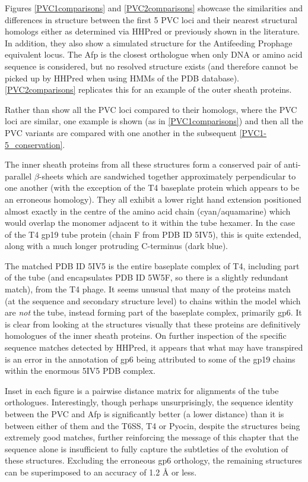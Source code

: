 Figures \vref{PVC1comparisons} and \vref{PVC2comparisons} showcase the similarities and differences in structure between the first 5 PVC loci and their nearest structural homologs either as determined via HHPred or previously shown in the literature. In addition, they also show a simulated structure for the Antifeeding Prophage equivalent locus. The Afp is the closest orthologue when only DNA or amino acid sequence is considered, but no resolved structure exists (and therefore cannot be picked up by HHPred when using HMMs of the PDB database). \vref{PVC2comparisons} replicates this for an example of the outer sheath proteins.

Rather than show all the PVC loci compared to their homologs, where the PVC loci are similar, one example is shown (as in \vref{PVC1comparisons}) and then all the PVC variants are compared with one another in the subsequent \vref{PVC1-5_conservation}.

The inner sheath proteins from all these structures form a conserved pair of anti-parallel $\beta$-sheets which are sandwiched together approximately perpendicular to one another (with the exception of the T4 baseplate protein which appears to be an erroneous homology). They all exhibit a lower right hand extension positioned almost exactly in the centre of the amino acid chain (cyan/aquamarine) which would overlap the monomer adjacent to it within the tube hexamer. In the case of the T4 gp19 tube protein (chain F from PDB ID 5IV5), this is quite extended, along with a much longer protruding C-terminus (dark blue).

The matched PDB ID 5IV5 is the entire baseplate complex of T4, including part of the tube (and encapsulates PDB ID 5W5F, so there is a slightly redundant match), from the T4 phage. It seems unusual that many of the proteins match (at the sequence and secondary structure level) to chains within the model which are \emph{not} the tube, instead forming part of the baseplate complex, primarily gp6. It is clear from looking at the structures visually that these proteins are definitively homologues of the inner sheath proteins. On further inspection of the specific sequence matches detected by HHPred, it appears that what may have transpired is an error in the annotation of gp6 being attributed to some of the gp19 chains within the enormous 5IV5 PDB complex.

Inset in each figure is a pairwise distance matrix for alignments of the tube orthologues. Interestingly, though perhaps unsurprisingly, the sequence identity between the PVC and Afp is significantly better (a lower distance) than it is between either of them and the T6SS, T4 or Pyocin, despite the structures being extremely good matches, further reinforcing the message of this chapter that the sequence alone is insufficient to fully capture the subtleties of the evolution of these structures. Excluding the erroneous gp6 orthology, the remaining structures can be superimposed to an accuracy of 1.2 \AA{} or less.

